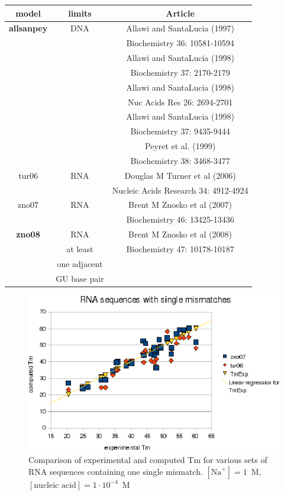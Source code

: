 \documentclass{article}
\begin{document}
\begin{table}[h][c]
\begin{tabular}[h]{| c | c | c |}
\textbf{model} & \textbf{limits} & \textbf{Article} \\
 \hline
\textbf{allsanpey} & DNA & Allawi and SantaLucia (1997)\\
 & & Biochemistry 36: 10581-10594 \\
 & & Allawi and SantaLucia (1998)\\
 & & Biochemistry 37: 2170-2179 \\
 & & Allawi and SantaLucia (1998)\\
 & & Nuc Acids Res 26: 2694-2701 \\
 & & Allawi and SantaLucia (1998)\\
 & & Biochemistry 37: 9435-9444 \\
 & & Peyret et al. (1999)\\
 & & Biochemistry 38: 3468-3477 \\
 \hline 
tur06 & RNA & Douglas M Turner et al (2006)\\
 & & Nucleic Acids Research 34: 4912-4924 \\
 \hline
zno07 & RNA & Brent M Znosko et al (2007)\\
 & & Biochemistry 46: 13425-13436 \\
 \hline
\textbf{zno08} & RNA & Brent M Znosko et al (2008)\\
 & at least & Biochemistry 47: 10178-10187 \\
 & one adjacent & \\
 & GU base pair & \\
 \hline
\end{tabular}
\end{table}
\pagebreak

\begin{figure}[h]
\includegraphics[width=1\linewidth]{images/RNASingleMismatch}
\caption{Comparison of experimental and computed Tm for various sets of
 RNA sequences containing one single mismatch. $[\mbox{Na}^+] = 1$~M, $[\mbox{nucleic acid}] = 1\cdot{}10^{-4}$~M}
\end{figure}
\end{document}
